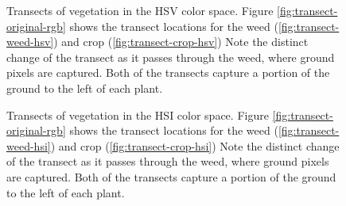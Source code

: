 \documentclass[letterpaper]{article}
\begin{document}
{\begin{figure}[h]
	\centering
	\hfill
	\hfill
	\caption[HSV Transects]{Transects of vegetation in the HSV color space. Figure \ref{fig:transect-original-rgb} shows the transect locations for the weed (\ref{fig:transect-weed-hsv}) and crop (\ref{fig:transect-crop-hsv}) Note the distinct change of the transect as it passes through the weed, where ground pixels are captured. Both of the transects capture a portion of the ground to the left of each plant.}
	\label{fig:transects-hsv}
\end{figure}

\begin{figure}[h]
	\centering
	\hfill
	\hfill
	\caption[HSI Transects]{Transects of vegetation in the HSI color space. Figure \ref{fig:transect-original-rgb} shows the transect locations for the weed (\ref{fig:transect-weed-hsi}) and crop (\ref{fig:transect-crop-hsi}) Note the distinct change of the transect as it passes through the weed, where ground pixels are captured. Both of the transects capture a portion of the ground to the left of each plant.}
	\label{fig:transects-hsv}
\end{figure}


}
\end{document}
